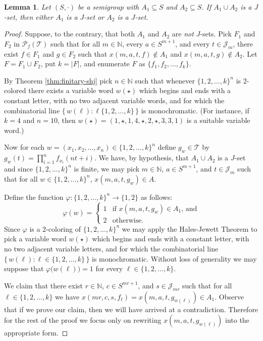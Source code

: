 \documentclass[12pt,showtrims]{memoir}
\theoremstyle{plain}
\newtheorem{lem}[thm]{Lemma}
\theoremstyle{definition}
\newcommand{\bbN}{\mathbb{N}}
\newcommand{\calJ}{\mathcal{J}}
\newcommand{\calT}{\mathcal{T}}
\newcommand{\Pf}{\mathcal{P}_f}
\begin{document}
\begin{lem}
  \label{lem:pr-jsets}
  Let $(S, \cdot)$ be a semigroup with $A_1 \subseteq S$ and $A_2 \subseteq S$.
  If $A_1 \cup A_2$ is a $J$-set, then either $A_1$ is a $J$-set or $A_2$ is a $J$-set.
\end{lem}
\begin{proof}
  Suppose, to the contrary, that both $A_1$ and $A_2$ are \emph{not} $J$-sets.
  Pick $F_1$ and $F_2$ in $\Pf(\calT)$ such that for all $m \in \bbN$, every $a \in S^{m+1}$, and every $t \in \calJ_m$, there exist $f \in F_1$ and $g \in F_2$ such that $x(m, a, t, f) \not\in A_1$ and $x(m, a, t, g) \not\in A_2$.
  Let $F = F_1 \cup F_2$, put $k = |F|$, and enumerate $F$ as $\{f_1, f_2, \ldots, f_k\}$.

  By Theorem \ref{thm:finitary-shj} pick $n \in \bbN$ such that whenever $\{1, 2, \ldots, k\}^n$ is 2-colored there exists a variable word $w(\star)$ which begins and ends with a constant letter, with no two adjacent variable words, and for which the combinatorial line $\bigl\{\, w(\ell) : \ell \{1, 2, \ldots, k\} \,\bigr\}$ is monochromatic. 
  (For instance, if $k = 4$ and $n = 10$, then $w(\star) = (1, \star, 1, 4, \star, 2, \star, 3, 3, 1)$ is a suitable variable word.)

  Now for each $w = (x_1, x_2, \ldots, x_n) \in \{1, 2, \ldots, k\}^n$ define $g_w \in \calT$ by $g_w(t) = \prod_{i=1}^n f_{x_i}(nt + i)$.
  We have, by hypothesis, that $A_1 \cup A_2$ is a $J$-set and since $\{1, 2, \ldots, k\}^n$ is finite, we may pick $m \in \bbN$, $a \in S^{m+1}$, and $t \in \calJ_m$ such that for all $w \in \{1, 2, \ldots, k\}^n$, $x(m, a, t, g_w) \in A$.

  Define the function $\varphi \colon \{1, 2, \ldots, k\}^n \to \{1, 2\}$ as follows:
  \[
    \varphi(w) = 
    \begin{cases}
      1 & \mbox{if $x(m, a, t, g_w) \in A_1$, and} \\
      2 & \mbox{otherwise.}
    \end{cases}
  \]
  Since $\varphi$ is a 2-coloring of $\{1, 2, \ldots, k\}^n$ we may apply the Hales-Jewett Theorem to pick a variable word $w(\star)$ which begins and ends with a constant letter, with no two adjacent variable letters, and for which the combinatorial line $\bigl\{\, w(\ell) : \ell \in \{1, 2, \ldots, k\} \,\bigr\}$ is monochromatic. 
  Without loss of generality we may suppose that $\varphi \bigl( w(\ell) \bigr) = 1$ for every $\ell \in \{1, 2, \ldots, k\}$.

  We claim that there exist $r \in \bbN$, $c \in S^{mr+1}$, and $s \in \calJ_{mr}$ such that for all $\ell \in \{1, 2, \ldots, k\}$ we have $x(mr, c, s, f_\ell) = x(m, a, t, g_{w(\ell)}) \in A_1$. 
  Observe that if we prove our claim, then we will have arrived at a contradiction. 
  Therefore for the rest of the proof we focus only on rewriting $x(m, a, t, g_{w(\ell)})$ into the appropriate form.


\end{proof}
\end{document}
